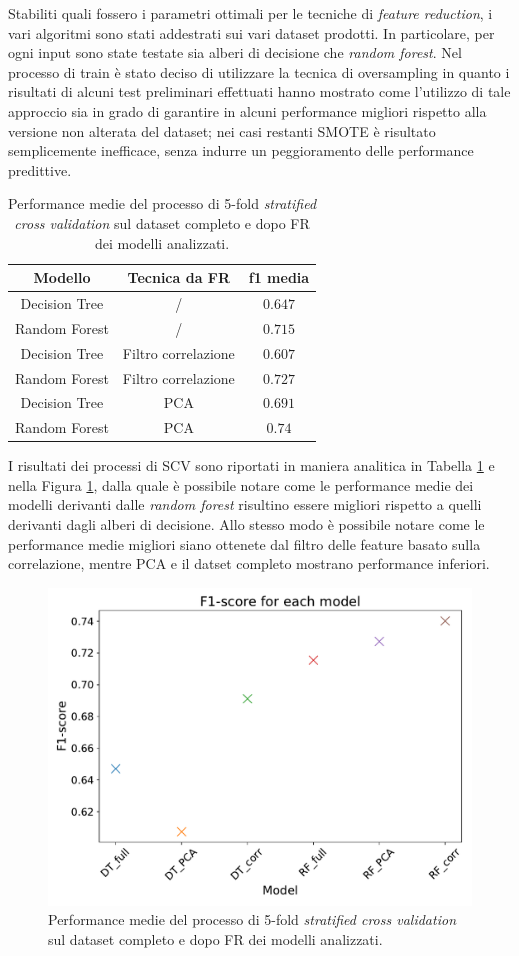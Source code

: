 Stabiliti quali fossero i parametri ottimali per le tecniche di \textit{feature reduction}, i vari algoritmi sono stati addestrati sui vari dataset prodotti. In particolare, per ogni input sono state testate sia alberi di decisione che \textit{random forest}. Nel processo di train è stato deciso di utilizzare la tecnica di oversampling in quanto i risultati di alcuni test preliminari effettuati hanno mostrato come l'utilizzo di tale approccio sia in grado di garantire in alcuni performance migliori rispetto alla versione non alterata del dataset; nei casi restanti SMOTE è risultato semplicemente inefficace, senza indurre un peggioramento delle performance predittive.
\begin{table}
	\centering
	\caption{Performance medie del processo di 5-fold \textit{stratified cross validation} sul dataset completo e dopo FR dei modelli analizzati.}
	\label{tab:f1score}
	\begin{tabular}{|c|c|c|}
		\toprule
		Modello & Tecnica da FR & f1 media \\ 
		\midrule 
		Decision Tree & / & $0.647$ \\  
		Random Forest & / & $0.715$ \\ 
		Decision Tree & Filtro correlazione & $0.607$ \\ 
		Random Forest & Filtro correlazione & $0.727$ \\ 
		Decision Tree & PCA & $0.691$ \\ 
		Random Forest & PCA & $0.74$ \\ 
		\bottomrule
	\end{tabular}
\end{table}
I risultati dei processi di SCV sono riportati in maniera analitica in Tabella \ref{tab:f1score} e nella Figura \ref{fig:fscore}, dalla quale è possibile notare come le performance medie dei modelli derivanti dalle \textit{random forest} risultino essere migliori rispetto a quelli derivanti dagli alberi di decisione. Allo stesso modo è possibile notare come le performance medie migliori siano ottenete dal filtro delle feature basato sulla correlazione, mentre PCA e il datset completo mostrano performance inferiori. 
\begin{figure}
	\centering
	\includegraphics[width=0.8\linewidth]{images/fscore}
	\caption{Performance medie del processo di 5-fold \textit{stratified cross validation} sul dataset completo e dopo FR dei modelli analizzati.}
	\label{fig:fscore}
\end{figure}
